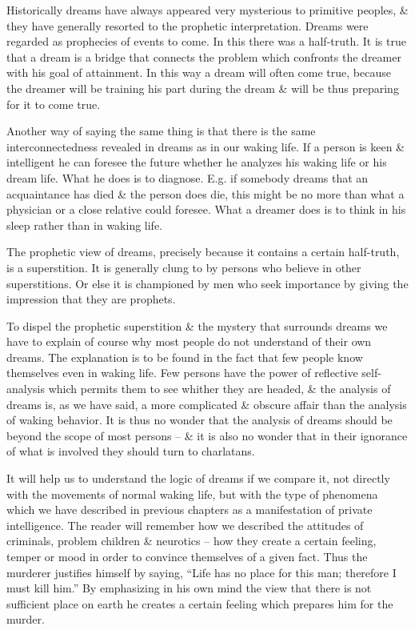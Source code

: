 \documentclass{article}
\numberwithin{equation}{section}
\begin{document}
Historically dreams have always appeared very mysterious to primitive peoples, \& they have generally resorted to the prophetic interpretation. Dreams were regarded as prophecies of events to come. In this there was a half-truth. It is true that a dream is a bridge that connects the problem which confronts the dreamer with his goal of attainment. In this way a dream will often come true, because the dreamer will be training his part during the dream \& will be thus preparing for it to come true.

Another way of saying the same thing is that there is the same interconnectedness revealed in dreams as in our waking life. If a person is keen \& intelligent he can foresee the future whether he analyzes his waking life or his dream life. What he does is to diagnose. E.g. if somebody dreams that an acquaintance has died \& the person does die, this might be no more than what a physician or a close relative could foresee. What a dreamer does is to think in his sleep rather than in waking life.

The prophetic view of dreams, precisely because it contains a certain half-truth, is a superstition. It is generally clung to by persons who believe in other superstitions. Or else it is championed by men who seek importance by giving the impression that they are prophets.

To dispel the prophetic superstition \& the mystery that surrounds dreams we have to explain of course why most people do not understand of their own dreams. The explanation is to be found in the fact that few people know themselves even in waking life. Few persons have the power of reflective self-analysis which permits them to see whither they are headed, \& the analysis of dreams is, as we have said, a more complicated \& obscure affair than the analysis of waking behavior. It is thus no wonder that the analysis of dreams should be beyond the scope of most persons -- \& it is also no wonder that in their ignorance of what is involved they should turn to charlatans.

It will help us to understand the logic of dreams if we compare it, not directly with the movements of normal waking life, but with the type of phenomena which we have described in previous chapters as a manifestation of private intelligence. The reader will remember how we described the attitudes of criminals, problem children \& neurotics -- how they create a certain feeling, temper or mood in order to convince themselves of a given fact. Thus the murderer justifies himself by saying, ``Life has no place for this man; therefore I must kill him.'' By emphasizing in his own mind the view that there is not sufficient place on earth he creates a certain feeling which prepares him for the murder.
\end{document}
